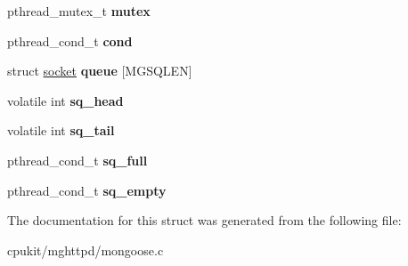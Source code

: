 \begin{DoxyCompactItemize}
pthread\+\_\+mutex\+\_\+t {\bfseries mutex}
\item 
\mbox{\label{structmg__context_ae7ffc4f7cdffe0c4341b3bc9bfb699a5}} 
pthread\+\_\+cond\+\_\+t {\bfseries cond}
\item 
\mbox{\label{structmg__context_a8ab4e70abe3464f9e8d4959688aff336}} 
struct \mbox{\hyperlink{structsocket}{socket}} {\bfseries queue} \mbox{[}M\+G\+S\+Q\+L\+EN\mbox{]}
\item 
\mbox{\label{structmg__context_a6df1d217787a1f213ddb9873f545d23f}} 
volatile int {\bfseries sq\+\_\+head}
\item 
\mbox{\label{structmg__context_ad0b2da59bdd93d8eb819ef552025b654}} 
volatile int {\bfseries sq\+\_\+tail}
\item 
\mbox{\label{structmg__context_aad49398eacc039c312d58c55530c65fa}} 
pthread\+\_\+cond\+\_\+t {\bfseries sq\+\_\+full}
\item 
\mbox{\label{structmg__context_a3260d5fc8e16e35026d7d2bbcb10abf5}} 
pthread\+\_\+cond\+\_\+t {\bfseries sq\+\_\+empty}
\end{DoxyCompactItemize}


The documentation for this struct was generated from the following file\+:\begin{DoxyCompactItemize}
\item 
cpukit/mghttpd/mongoose.\+c\end{DoxyCompactItemize}
